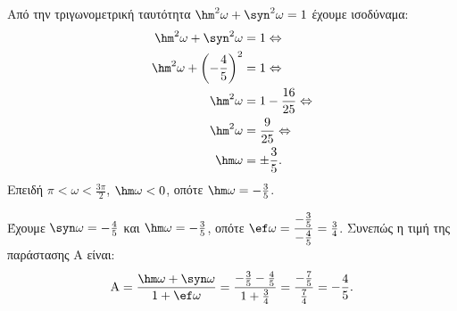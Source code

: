 \begin{alist}
\item Από την τριγωνομετρική ταυτότητα $\hm ^2\omega + \syn ^2\omega = 1$ έχουμε ισοδύναμα:
\begin{align*}
\hm ^2\omega + \syn ^2\omega &= 1 \Leftrightarrow \\
\hm ^2\omega + \left(-\frac{4}{5}\right)^2 &= 1 \Leftrightarrow \\
\hm ^2\omega &= 1 - \frac{16}{25} \Leftrightarrow \\
\hm ^2\omega &= \frac{9}{25} \Leftrightarrow \\
\hm \omega &= \pm \frac{3}{5}.
\end{align*}
Επειδή $\pi < \omega < \frac{3\pi}{2}$, $\hm \omega < 0$, οπότε $\hm \omega = -\frac{3}{5}$.
\item Έχουμε $\syn \omega = -\frac{4}{5}$ και $\hm \omega = -\frac{3}{5}$, οπότε $\ef \omega = \dfrac{-\frac{3}{5}}{-\frac{4}{5}} = \frac{3}{4}$. Συνεπώς η τιμή της παράστασης $\text{A}$ είναι:
\[\text{A} = \frac{\hm \omega + \syn \omega}{1 + \ef \omega} = \frac{-\frac{3}{5} - \frac{4}{5}}{1 + \frac{3}{4}} = \frac{-\frac{7}{5}}{\frac{7}{4}} = -\frac{4}{5}.\]
\end{alist}

